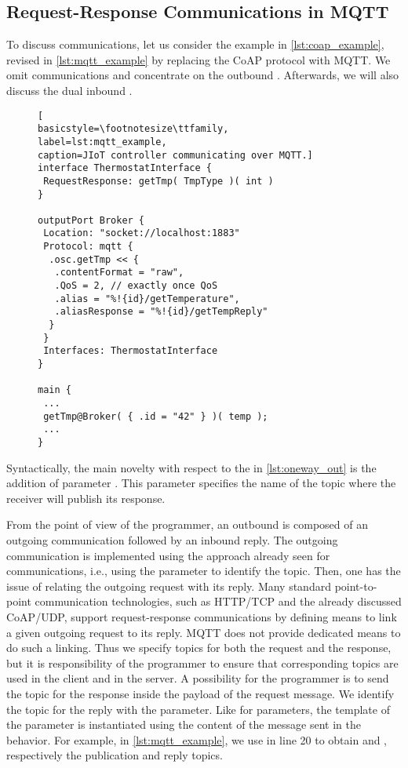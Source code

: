 \subsection{Request-Response Communications in MQTT}
\label{sub:rr_in_mqtt}

To discuss  communications, let us consider the
example in \cref{lst:coap_example}, revised in \cref{lst:mqtt_example}
by replacing the CoAP protocol with MQTT. We omit 
communications and concentrate on the
outbound . Afterwards, we will also discuss the
dual inbound .

\begin{figure}[t]
 \begin{lstlisting}[
basicstyle=\footnotesize\ttfamily,
label=lst:mqtt_example,
caption=JIoT controller communicating over MQTT.]
interface ThermostatInterface {
 RequestResponse: getTmp( TmpType )( int )
}

outputPort Broker {
 Location: "socket://localhost:1883"
 Protocol: mqtt {
  .osc.getTmp << {
   .contentFormat = "raw",
   .QoS = 2, // exactly once QoS
   .alias = "%!{id}/getTemperature",
   .aliasResponse = "%!{id}/getTempReply"
  }
 }
 Interfaces: ThermostatInterface
}

main {
 ...
 getTmp@Broker( { .id = "42" } )( temp );
 ...
}
\end{lstlisting}
\end{figure}

Syntactically, the main novelty with respect to the  in
\cref{lst:oneway_out} is the addition of  parameter
. This parameter specifies the name of the topic
where the receiver will publish its response.

From the point of view of the programmer, an outbound  is
composed of an outgoing communication followed by an inbound reply. The outgoing
communication is implemented using the approach already seen for 
communications, i.e., using the   parameter to
identify the topic. Then, one has the issue of relating the outgoing request
with its reply. Many standard point-to-point communication technologies, such as
HTTP/TCP and the already discussed CoAP/UDP, support request-response
communications by defining means to link a given outgoing request to its reply.
MQTT does not provide dedicated means to do such a linking.
Thus we specify topics for both the request and the response, but it is responsibility of the programmer to ensure that corresponding topics are used in the client and in the server. A possibility for the programmer is to send the topic for the response inside the payload of the request message.
%
We identify the topic for the reply with the
  parameter. Like for 
parameters, the template of the  parameter is instantiated
using the content of the message sent in the behavior. For example, in
\cref{lst:mqtt_example}, we use  in line 20 to obtain
 and , respectively the
publication and reply topics.

